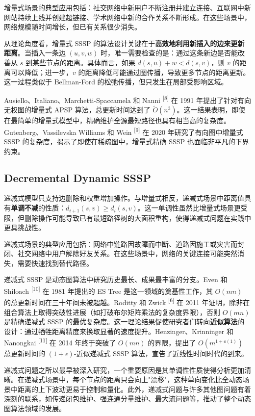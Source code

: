 \documentclass[12pt,a4paper]{ctexart}
\begin{document}
增量式场景的典型应用包括：社交网络中新用户不断注册并建立连接、互联网中新网站持续上线并创建超链接、学术网络中新的合作关系不断形成。在这些场景中，网络规模随时间增长，但已有关系很少消失。

从理论角度看，增量式 SSSP 的算法设计关键在于\textbf{高效地利用新插入的边来更新距离}。当插入一条边 $(u,v,w)$ 时，唯一需要检查的是：通过这条新边是否能改善从 $s$ 到某些节点的距离。具体而言，如果 $d(s,u)+w<d(s,v)$，则 $v$ 的距离可以降低；进一步，$v$ 的距离降低可能通过图传播，导致更多节点的距离更新。这一过程类似于 Bellman-Ford 的松弛传播，但只发生在局部受影响区域。

Ausiello、Italiano、Marchetti-Spaccamela 和 Nanni \textsuperscript{[8]}  在 1991 年提出了针对有向无权图的增量式 APSP 算法，总更新时间达到了 $\tilde{O}(n^3)$。这一结果表明，即使在最简单的增量式模型中，精确维护全源最短路径也具有相当高的复杂度。Gutenberg、Vassilevska Williams 和 Wein \textsuperscript{[9]}  在 2020 年研究了有向图中增量式 SSSP 的复杂度，揭示了即使在稀疏图中，增量式精确 SSSP 也面临非平凡的下界约束。

\subsection{Decremental Dynamic SSSP}

递减式模型只支持边删除和权重增加操作。与增量式相反，递减式场景中距离值具有\textbf{单调不减}的性质：$d_{i+1}(s,v)\geq d_i(s,v)$。这一单调性虽然比增量式场景更受限，但删除操作可能导致已有最短路径树的大面积重构，使得递减式问题在实践中更具挑战性。

递减式场景的典型应用包括：网络中链路因故障而中断、道路因施工或灾害而封闭、社交网络中用户解除好友关系。在这些场景中，网络的关键连接可能突然消失，需要快速找到替代路径。

递减式 SSSP 是动态图算法中研究历史最长、成果最丰富的分支。Even 和 Shiloach \textsuperscript{[10]}  在 1981 年提出的 ES Tree 是这一领域的奠基性工作，其 $O(mn)$ 的总更新时间在三十年间未被超越。Roditty 和 Zwick \textsuperscript{[6]}  在 2011 年证明，除非在组合算法上取得突破性进展（如打破布尔矩阵乘法的复杂度界限），否则 $O(mn)$ 是精确递减式 SSSP 的最优复杂度。这一理论结果促使研究者们转向\textbf{近似算法}的设计：通过牺牲距离精度来换取显著的速度提升。Henzinger、Krinninger 和 Nanongkai \textsuperscript{[11]}  在 2014 年终于突破了 $O(mn)$ 的界限，提出了 $O(m^{1+o(1)})$ 总更新时间的 $(1+\epsilon)$-近似递减式 SSSP 算法，宣告了近线性时间时代的到来。

递减式问题之所以最早被深入研究，一个重要原因是其单调性性质使得分析更加清晰。在递减式场景中，每个节点的距离只会向上"漂移"，这种单向变化比全动态场景中距离的上下波动更易于控制和量化。此外，递减式问题与许多其他图问题有着深刻的联系，如传递闭包维护、强连通分量维护、最大流问题等，推动了整个动态图算法领域的发展。
\end{document}
